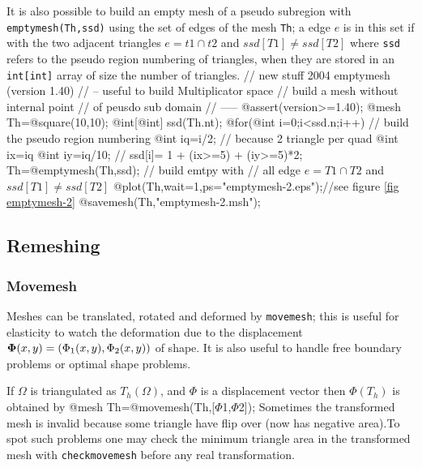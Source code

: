 \documentclass[a4paper,twoside,12pt]{book}
\def\vec#1{\mbox{\boldmath $#1$}}
\def\setS#1{#1\label{sec:#1}}
\begin{document}
It is also possible to build an empty mesh of a pseudo subregion
with \texttt{emptymesh(Th,ssd)} using the set of edges of the mesh \texttt{Th};
a edge $e$ is in  this set  if with the two adjacent triangles $e =t1\cap t2$
and  $ ssd[T1] \neq ssd[T2]$ where \texttt{ssd}  refers to the pseudo region
numbering of triangles, when they are stored in an \texttt{int[int]} array of size the number of triangles.
\bFF
{  //  new stuff 2004 emptymesh (version 1.40) \hfilll
 // -- useful to build Multiplicator space \hfilll
 //  build a mesh without internal point \hfilll
 // of peusdo sub domain  \hfilll
 //  ----- \hfilll
  @assert(version>=1.40);
  @mesh Th=@square(10,10);
  @int[@int] ssd(Th.nt);
  @for(@int i=0;i<ssd.n;i++) // build the  pseudo region numbering
   {  @int iq=i/2;   // because 2 triangle per quad
      @int ix=iq%
      @int iy=iq/10; //
    ssd[i]= 1 + (ix>=5) +  (iy>=5)*2;
   }
  Th=@emptymesh(Th,ssd); // build emtpy  with
  //  all edge $e = T1 \cap T2$ and $ ssd[T1] \neq ssd[T2]$
  @plot(Th,wait=1,ps="emptymesh-2.eps");//see figure \ref{fig emptymesh-2}
  @savemesh(Th,"emptymesh-2.msh");
}
\eFF


\subsection{Remeshing}
\subsubsection{\setS{Movemesh}}

Meshes can be translated, rotated and deformed by {\tt movemesh}; this is useful for
 elasticity to watch the deformation due to the displacement
$\vec\Phi(x,y)=(\Phi_1(x,y),\Phi_2(x,y))$ of shape. It is also useful to
handle free boundary  problems or optimal shape problems.

If $\Omega$ is triangulated as $T_h(\Omega)$,
and $\Phi$ is a displacement vector then $\Phi(T_h)$ is obtained by
\bFF
@mesh  Th=@movemesh(Th,[$\Phi$1,$\Phi$2]);
\eFF
Sometimes the transformed mesh is invalid because some triangle
have flip over (now has negative area).To spot such problems one may check the
minimum triangle area in the transformed mesh with
\texttt{checkmovemesh} before any real transformation.
\end{document}
